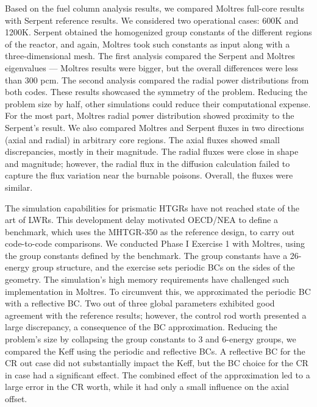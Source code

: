 Based on the fuel column analysis results, we compared Moltres full-core results with Serpent reference results.
We considered two operational cases: 600K and 1200K.
Serpent obtained the homogenized group constants of the different regions of the reactor, and again, Moltres took such constants as input along with a three-dimensional mesh.
The first analysis compared the Serpent and Moltres eigenvalues --- Moltres results were bigger, but the overall differences were less than 300 pcm.
The second analysis compared the radial power distributions from both codes.
These results showcased the symmetry of the problem.
Reducing the problem size by half, other simulations could reduce their computational expense.
For the most part, Moltres radial power distribution showed proximity to the Serpent's result.
We also compared Moltres and Serpent fluxes in two directions (axial and radial) in arbitrary core regions.
The axial fluxes showed small discrepancies, mostly in their magnitude.
The radial fluxes were close in shape and magnitude; however, the radial flux in the diffusion calculation failed to capture the flux variation near the burnable poisons.
Overall, the fluxes were similar.

The simulation capabilities for prismatic HTGRs have not reached state of the art of LWRs.
This development delay motivated OECD/NEA to define a benchmark, which uses the MHTGR-350 as the reference design, to carry out code-to-code comparisons.
We conducted Phase I Exercise 1 with Moltres, using the group constants defined by the benchmark.
The group constants have a 26-energy group structure, and the exercise sets periodic \glspl{BC} on the sides of the geometry.
The simulation's high memory requirements have challenged such implementation in Moltres.
To circumvent this, we approximated the periodic \gls{BC} with a reflective BC.
Two out of three global parameters exhibited good agreement with the reference results; however, the control rod worth presented a large discrepancy, a consequence of the BC approximation.
Reducing the problem's size by collapsing the group constants to 3 and 6-energy groups, we compared the \gls{Keff} using the periodic and reflective BCs.
A reflective BC for the \gls{CR} out case did not substantially impact the \gls{Keff}, but the BC choice for the CR in case had a significant effect.
The combined effect of the approximation led to a large error in the CR worth, while it had only a small influence on the axial offset.